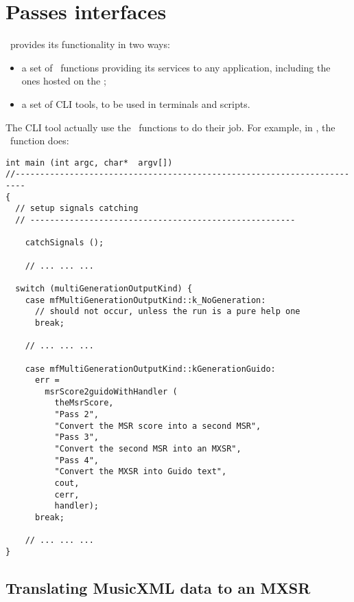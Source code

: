 
\chapter{Passes interfaces}

\mf\ provides its functionality in two ways:
\begin{itemize}
\item a set of \API\ functions providing its services to any application, including the ones hosted on the \Web;
\item a set of CLI tools, to be used in terminals and scripts.
\end{itemize}

The CLI tool actually use the \API\ functions to do their job. For example, in {\tt }, the \mainFunction\ function does:
\begin{lstlisting}[language=CPlusPlus]
int main (int argc, char*  argv[])
//------------------------------------------------------------------------
{
  // setup signals catching
  // ------------------------------------------------------

	catchSignals ();

	// ... ... ...

  switch (multiGenerationOutputKind) {
    case mfMultiGenerationOutputKind::k_NoGeneration:
      // should not occur, unless the run is a pure help one
      break;

  	// ... ... ...

    case mfMultiGenerationOutputKind::kGenerationGuido:
      err =
        msrScore2guidoWithHandler (
          theMsrScore,
          "Pass 2",
          "Convert the MSR score into a second MSR",
          "Pass 3",
          "Convert the second MSR into an MXSR",
          "Pass 4",
          "Convert the MXSR into Guido text",
          cout,
          cerr,
          handler);
      break;

	// ... ... ...
}
\end{lstlisting}


\section{Translating MusicXML data to an MXSR}


